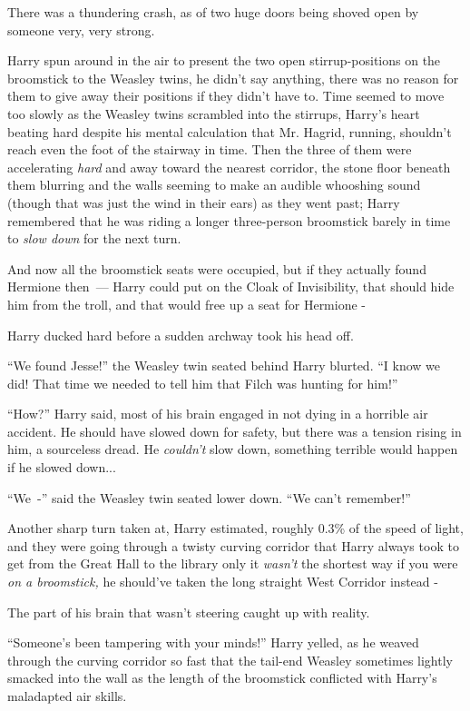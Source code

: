 There was a thundering crash, as of two huge doors being shoved open by someone very, very strong.

Harry spun around in the air to present the two open stirrup-positions on the broomstick to the Weasley twins, he didn't say anything, there was no reason for them to give away their positions if they didn't have to. Time seemed to move too slowly as the Weasley twins scrambled into the stirrups, Harry's heart beating hard despite his mental calculation that Mr. Hagrid, running, shouldn't reach even the foot of the stairway in time. Then the three of them were accelerating \emph{hard} and away toward the nearest corridor, the stone floor beneath them blurring and the walls seeming to make an audible whooshing sound (though that was just the wind in their ears) as they went past; Harry remembered that he was riding a longer three-person broomstick barely in time to \emph{slow down} for the next turn.

And now all the broomstick seats were occupied, but if they actually found Hermione then~--- Harry could put on the Cloak of Invisibility, that should hide him from the troll, and that would free up a seat for Hermione -

Harry ducked hard before a sudden archway took his head off.

``We found Jesse!'' the Weasley twin seated behind Harry blurted. ``I know we did! That time we needed to tell him that Filch was hunting for him!''

``How?'' Harry said, most of his brain engaged in not dying in a horrible air accident. He should have slowed down for safety, but there was a tension rising in him, a sourceless dread. He \emph{couldn't} slow down, something terrible would happen if he slowed down...

``We~-'' said the Weasley twin seated lower down. ``We can't remember!''

Another sharp turn taken at, Harry estimated, roughly 0.3\% of the speed of light, and they were going through a twisty curving corridor that Harry always took to get from the Great Hall to the library only it \emph{wasn't} the shortest way if you were \emph{on a broomstick,} he should've taken the long straight West Corridor instead -

The part of his brain that wasn't steering caught up with reality.

``Someone's been tampering with your minds!'' Harry yelled, as he weaved through the curving corridor so fast that the tail-end Weasley sometimes lightly smacked into the wall as the length of the broomstick conflicted with Harry's maladapted air skills.

